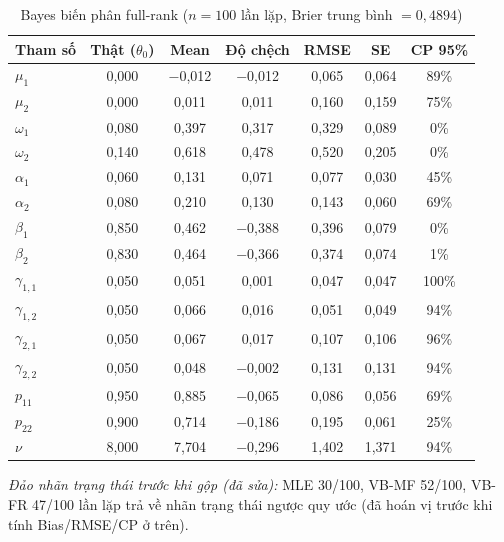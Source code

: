 \documentclass[11pt,a4paper]{article}
\begin{document}
\begin{table}[H]\centering\footnotesize
\caption{Bayes biến phân full-rank ($n=100$ lần lặp, Brier trung bình $=0,4894$)}
\begin{tabularx}{\textwidth}{l C C C C C C}
\toprule
\textbf{Tham số} & \textbf{Thật ($\theta_0$)} & \textbf{Mean} & \textbf{Độ chệch} & \textbf{RMSE} & \textbf{SE} & \textbf{CP 95\%} \\
\midrule
$\mu_1$ & 0,000 & $-$0,012 & $-$0,012 & 0,065 & 0,064 & 89\% \\
$\mu_2$ & 0,000 & 0,011 & 0,011 & 0,160 & 0,159 & 75\% \\
$\omega_1$ & 0,080 & 0,397 & 0,317 & 0,329 & 0,089 & 0\% \\
$\omega_2$ & 0,140 & 0,618 & 0,478 & 0,520 & 0,205 & 0\% \\
$\alpha_1$ & 0,060 & 0,131 & 0,071 & 0,077 & 0,030 & 45\% \\
$\alpha_2$ & 0,080 & 0,210 & 0,130 & 0,143 & 0,060 & 69\% \\
$\beta_1$ & 0,850 & 0,462 & $-$0,388 & 0,396 & 0,079 & 0\% \\
$\beta_2$ & 0,830 & 0,464 & $-$0,366 & 0,374 & 0,074 & 1\% \\
$\gamma_{1,1}$ & 0,050 & 0,051 & 0,001 & 0,047 & 0,047 & 100\% \\
$\gamma_{1,2}$ & 0,050 & 0,066 & 0,016 & 0,051 & 0,049 & 94\% \\
$\gamma_{2,1}$ & 0,050 & 0,067 & 0,017 & 0,107 & 0,106 & 96\% \\
$\gamma_{2,2}$ & 0,050 & 0,048 & $-$0,002 & 0,131 & 0,131 & 94\% \\
$p_{11}$ & 0,950 & 0,885 & $-$0,065 & 0,086 & 0,056 & 69\% \\
$p_{22}$ & 0,900 & 0,714 & $-$0,186 & 0,195 & 0,061 & 25\% \\
$\nu$ & 8,000 & 7,704 & $-$0,296 & 1,402 & 1,371 & 94\% \\
\bottomrule
\end{tabularx}
\end{table}

\emph{Đảo nhãn trạng thái trước khi gộp (đã sửa):} MLE 30/100, VB-MF 52/100, VB-FR 47/100 lần lặp trả về nhãn trạng thái ngược quy ước (đã hoán vị trước khi tính Bias/RMSE/CP ở trên).
\bigskip
\end{document}
